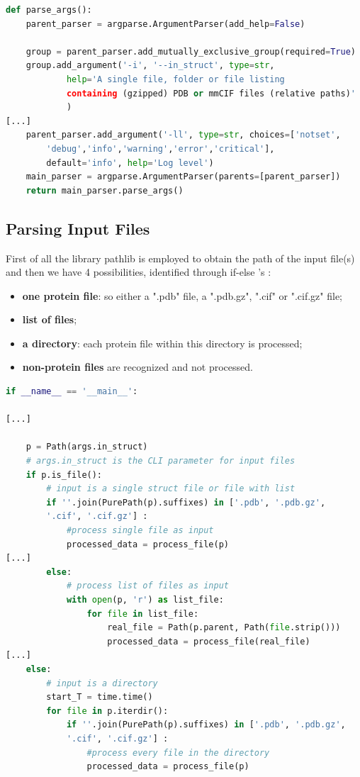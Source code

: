 \begin{lstlisting}[language=Python, caption=Command-line\ arguments\ parsing.]
def parse_args():
    parent_parser = argparse.ArgumentParser(add_help=False)

    group = parent_parser.add_mutually_exclusive_group(required=True)
    group.add_argument('-i', '--in_struct', type=str,
            help='A single file, folder or file listing 
            containing (gzipped) PDB or mmCIF files (relative paths)'
            )   
[...]
    parent_parser.add_argument('-ll', type=str, choices=['notset',
        'debug','info','warning','error','critical'], 
        default='info', help='Log level')
    main_parser = argparse.ArgumentParser(parents=[parent_parser])
    return main_parser.parse_args()
\end{lstlisting}

\pagebreak

\subsection{Parsing Input Files}
First of all the library pathlib is employed to obtain the path of the input file(s) and then we have 4 possibilities, identified through if-else 's :
\begin{itemize}
    \item \textbf{one protein file}: so either a ".pdb" file, a ".pdb.gz", ".cif" or ".cif.gz" file;
    \item \textbf{list of files};
    \item \textbf{a directory}: each protein file within this directory is processed;
    \item \textbf{non-protein files} are recognized and not processed.
\end{itemize}

\begin{lstlisting}[language=Python, caption=Input\ files\ parsing]
if __name__ == '__main__':
    
[...]
    
    p = Path(args.in_struct)
    # args.in_struct is the CLI parameter for input files
    if p.is_file():
        # input is a single struct file or file with list
        if ''.join(PurePath(p).suffixes) in ['.pdb', '.pdb.gz', 
        '.cif', '.cif.gz'] :
            #process single file as input
            processed_data = process_file(p)
[...]
        else:
            # process list of files as input 
            with open(p, 'r') as list_file:
                for file in list_file:
                    real_file = Path(p.parent, Path(file.strip()))
                    processed_data = process_file(real_file)
[...]
    else:
        # input is a directory
        start_T = time.time()
        for file in p.iterdir():
            if ''.join(PurePath(p).suffixes) in ['.pdb', '.pdb.gz',
            '.cif', '.cif.gz'] :
                #process every file in the directory
                processed_data = process_file(p)
\end{lstlisting}


